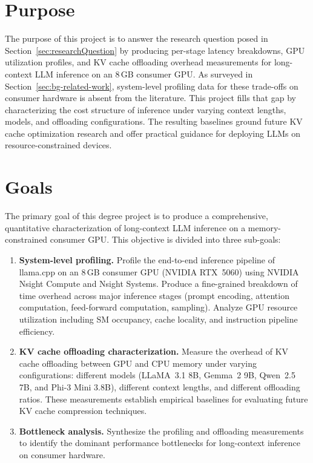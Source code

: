 \documentclass[
english,                 %
bibtex,                  %
]{kththesis}
\numberwithin{listing}{chapter}
\begin{document}
\section{Purpose}
\label{sec:purpose}
The purpose of this project is to answer the research question posed in Section~\ref{sec:researchQuestion} by producing per-stage latency breakdowns, \gls{GPU} utilization profiles, and \gls{KV} cache offloading overhead measurements for long-context \gls{LLM} inference on an 8\,GB consumer \gls{GPU}. As surveyed in Section~\ref{sec:bg-related-work}, system-level profiling data for these trade-offs on consumer hardware is absent from the literature. This project fills that gap by characterizing the cost structure of inference under varying context lengths, models, and offloading configurations. The resulting baselines ground future \gls{KV} cache optimization research and offer practical guidance for deploying \glspl{LLM} on resource-constrained devices.

\section{Goals}
\label{sec:goals}
The primary goal of this degree project is to produce a comprehensive, quantitative characterization of long-context \gls{LLM} inference on a memory-constrained consumer \gls{GPU}. This objective is divided into three sub-goals:

\begin{enumerate}
\item \textbf{System-level profiling.} Profile the end-to-end inference pipeline of llama.cpp on an 8\,GB consumer \gls{GPU} (NVIDIA RTX~5060) using NVIDIA Nsight Compute and Nsight Systems. Produce a fine-grained breakdown of time overhead across major inference stages (prompt encoding, attention computation, feed-forward computation, sampling). Analyze \gls{GPU} resource utilization including \gls{SM} occupancy, cache locality, and instruction pipeline efficiency.
\item \textbf{KV cache offloading characterization.} Measure the overhead of \gls{KV} cache offloading between \gls{GPU} and \gls{CPU} memory under varying configurations: different models (LLaMA~3.1 8B, Gemma~2 9B, Qwen~2.5 7B, and Phi-3 Mini 3.8B), different context lengths, and different offloading ratios. These measurements establish empirical baselines for evaluating future \gls{KV} cache compression techniques.
\item \textbf{Bottleneck analysis.} Synthesize the profiling and offloading measurements to identify the dominant performance bottlenecks for long-context inference on consumer hardware.
\end{enumerate}
\end{document}
